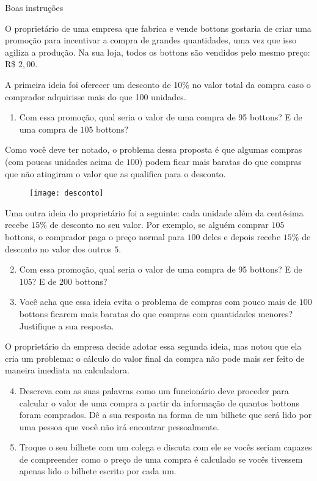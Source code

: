 \begin{task}{Boas instruções}
\label{comp-task1}

O proprietário de uma empresa que fabrica e vende bottons gostaria de criar uma promoção para incentivar a compra de grandes quantidades, uma vez que isso agiliza a produção. Na sua loja, todos os bottons são vendidos pelo mesmo preço: R\$ $2,00$.

A primeira ideia foi oferecer um desconto de 10\% no valor total da compra caso o comprador adquirisse mais do que 100 unidades.

\begin{enumerate}
\item Com essa promoção, qual seria o valor de uma compra de 95 bottons? E de uma compra de $105$ bottons?
\end{enumerate}
Como você deve ter notado, o problema dessa proposta é que algumas compras (com poucas unidades acima de $100$) podem ficar mais baratas do que compras que não atingiram o valor que as qualifica para o desconto.

\begin{figure}[H]
\centering
\texttt{[image: desconto]}
\end{figure}

Uma outra ideia do proprietário foi a seguinte: cada unidade além da centésima recebe $15\%$ de desconto no seu valor. Por exemplo, se alguém comprar $105$ bottons, o comprador paga o preço normal para $100$ deles e depois recebe $15\%$ de desconto no valor dos outros $5$.

\begin{enumerate}
\setcounter{enumi}{1}

\item Com essa promoção, qual seria o valor de uma compra de 95 bottons? E de $105$? E de $200$ bottons?

\item Você acha que essa ideia evita o problema de compras com pouco mais de $100$ bottons ficarem mais baratas do que compras com quantidades menores? Justifique a sua resposta.
\end{enumerate}

O proprietário da empresa decide adotar essa segunda ideia, mas notou que ela cria um problema: o cálculo do valor final da compra não pode mais ser feito de maneira imediata na calculadora.

\begin{enumerate}
\setcounter{enumi}{3}

\item Descreva com as suas palavras como um funcionário deve proceder para calcular o valor de uma compra a partir da informação de quantos bottons foram comprados. Dê a sua resposta na forma de um bilhete que será lido por uma pessoa que você não irá encontrar pessoalmente.

\item Troque o seu bilhete com um colega e discuta com ele se vocês seriam capazes de compreender como o preço de uma compra é calculado se vocês tivessem apenas lido o bilhete escrito por cada um.
\end{enumerate}

\end{task}
\clearpage

